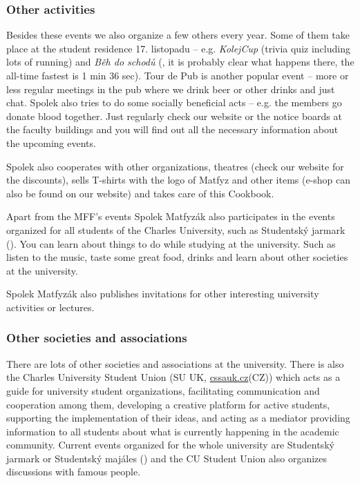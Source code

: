 \subsubsection{Other activities}
Besides these events we also organize a few others every year. Some of them take
place at the student residence 17. listopadu -- e.g. \textit{KolejCup} (trivia
quiz including lots of running) and \textit{Běh do schodů} (, it is probably clear what happens there, the all-time fastest is 1 min 36
sec).
Tour de Pub is another popular event -- more or less regular meetings in the pub
where we drink beer or other drinks and just chat.
Spolek also tries to do some socially beneficial acts -- e.g. the members go
donate blood together. Just regularly check our website or the notice boards at
the faculty buildings and you will find out all the necessary information about
the upcoming events.

Spolek also cooperates with other organizations, theatres (check our website for
the discounts), sells T-shirts with the logo of Matfyz and other items (e-shop
can also be found on our website) and takes care of this Cookbook.

Apart from the MFF's events Spolek Matfyzák also participates in the events
organized for all students of the Charles University, such as Studentský jarmark
(). You can learn about things to
do while studying at the university. Such as listen to the music, taste some great
food, drinks and learn about other societies at the university.

Spolek Matfyzák also publishes invitations for other interesting university
activities or lectures.


\subsubsection{Other societies and associations}
There are lots of other societies and associations at the university. There is
also the Charles University Student Union (SU UK, \url{cssauk.cz}(CZ)) which
acts as a guide for university student organizations, facilitating communication
and cooperation among them, developing a creative platform for active students,
supporting the implementation of their ideas, and acting as a mediator providing
information to all students about what is currently happening in the academic
community.
Current events organized for the whole university are Studentský jarmark or
Studentský majáles () and the CU Student Union also organizes
discussions with famous people.